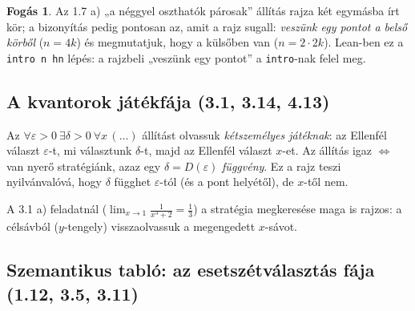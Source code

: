 \documentclass[11pt,a4paper]{article}
\newcommand{\lean}[1]{\texttt{\small #1}}
\newcommand{\eps}{\varepsilon}
\theoremstyle{definition}
\newtheorem{fogas}{Fogás}[section]
\begin{document}
\begin{fogas}
Az 1.7 a) „a néggyel oszthatók párosak” állítás rajza két egymásba írt kör; a bizonyítás
pedig pontosan az, amit a rajz sugall: \emph{veszünk egy pontot a belső körből}
($n=4k$) és megmutatjuk, hogy a külsőben van ($n=2\cdot 2k$).
Lean-ben ez a \lean{intro n hn} lépés: a rajzbeli „veszünk egy pontot” a
\lean{intro}-nak felel meg.
\end{fogas}

\subsection{A kvantorok játékfája (3.1, 3.14, 4.13)}

Az $\forall \eps>0\ \exists \delta>0\ \forall x\,(\dots)$ állítást olvassuk
\emph{kétszemélyes játéknak}: az Ellenfél választ $\eps$-t, mi választunk $\delta$-t,
majd az Ellenfél választ $x$-et. Az állítás igaz $\iff$ van nyerő stratégiánk, azaz
egy $\delta = D(\eps)$ \emph{függvény}. Ez a rajz teszi nyilvánvalóvá, hogy $\delta$
függhet $\eps$-tól (és a pont helyétől), de $x$-től nem.

\begin{center}
\end{center}

A 3.1 a) feladatnál ($\lim_{x\to1}\frac{1}{x^3+2}=\frac13$) a stratégia megkeresése
maga is rajzos: a célsávból ($y$-tengely) visszaolvassuk a megengedett $x$-sávot.

\subsection{Szemantikus tabló: az esetszétválasztás fája (1.12, 3.5, 3.11)}
\end{document}
